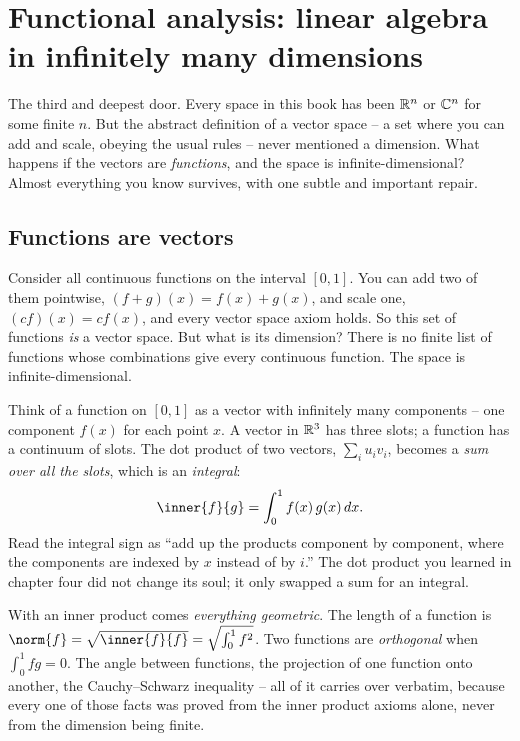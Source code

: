 \section{Functional analysis: linear algebra in infinitely many dimensions}
\label{ch37:functional}

The third and deepest door. Every space in this book has been $\mathbb{R}^n$ or $\mathbb{C}^n$ for
some finite $n$. But the abstract definition of a vector space -- a set where you
can add and scale, obeying the usual rules -- never mentioned a dimension. What
happens if the vectors are \emph{functions}, and the space is infinite-dimensional?
Almost everything you know survives, with one subtle and important repair.

\subsection{Functions are vectors}
\label{ch37:functions-are-vectors}

Consider all continuous functions on the interval $[0,1]$. You can add two of them
pointwise, $(f+g)(x)=f(x)+g(x)$, and scale one, $(cf)(x)=cf(x)$, and every vector
space axiom holds. So this set of functions \emph{is} a vector space. But what is
its dimension? There is no finite list of functions whose combinations give every
continuous function. The space is infinite-dimensional.

\begin{intuitionbox}
Think of a function on $[0,1]$ as a vector with infinitely many components -- one
component $f(x)$ for each point $x$. A vector in $\mathbb{R}^3$ has three slots; a function
has a continuum of slots. The dot product of two vectors, $\sum_i u_i v_i$, becomes
a \emph{sum over all the slots}, which is an \emph{integral}:
\[
  \inner{f}{g} = \int_0^1 f(x)\,g(x)\,dx.
\]
Read the integral sign as ``add up the products component by component, where the
components are indexed by $x$ instead of by $i$.'' The dot product you learned in
chapter four did not change its soul; it only swapped a sum for an integral.
\end{intuitionbox}

With an inner product comes \emph{everything geometric}. The length of a function
is $\norm{f} = \sqrt{\inner{f}{f}} = \sqrt{\int_0^1 f^2}$. Two functions are
\emph{orthogonal} when $\int_0^1 fg = 0$. The angle between functions, the
projection of one function onto another, the Cauchy--Schwarz inequality -- all of it
carries over verbatim, because every one of those facts was proved from the inner
product axioms alone, never from the dimension being finite.

